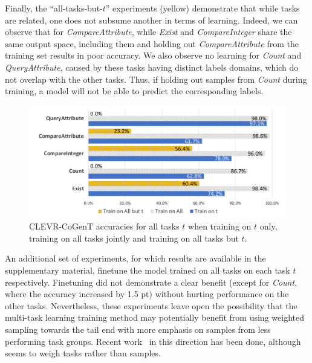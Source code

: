 Finally, the ``all-tasks-but-$t$'' experiments (yellow) demonstrate that while tasks are related, one does not subsume another in terms of learning. Indeed, we can observe that for \textit{CompareAttribute}, while \textit{Exist} and \textit{CompareInteger} share the same output space, including them and holding out \textit{CompareAttribute} from the training set results in poor accuracy. We also observe no learning for \textit{Count} and \textit{QueryAttribute}, caused by these tasks having distinct labels domains, which do not overlap with the other tasks. Thus, if holding out samples from \textit{Count} during training, a model will not be able to predict the corresponding labels.

\begin{figure}[!t]
	\centering
	\includegraphics[width=\columnwidth]{img/results/CoGenT_results.pdf}
	\caption{CLEVR-CoGenT accuracies for all tasks $t$ when training on $t$ only, training on all tasks jointly and training on all tasks but $t$.} %
	\label{fig:CoGenT-results}
\end{figure}

An additional set of experiments, for which results are available in the supplementary material,
finetune the model trained on all tasks on each task $t$ respectively.
Finetuning did not demonstrate a clear benefit (except for \textit{Count}, where the accuracy increased by 1.5 pt) without hurting performance on the other tasks. Nevertheless, these experiments leave open the possibility that the multi-task learning training method may potentially benefit from using weighted sampling towards the tail end with more emphasis on samples from less performing task groups. Recent work~\cite{guo2018dynamic, kendall2018multi} in this direction has been done, although seems to weigh tasks rather than samples.

